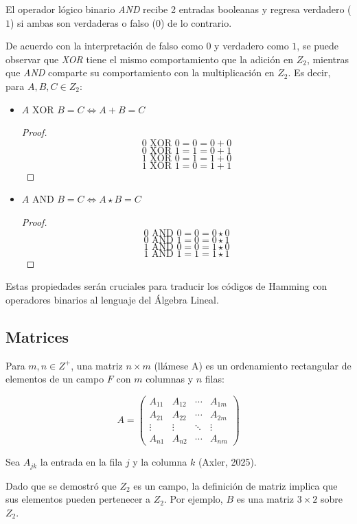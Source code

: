 \documentclass{article}
\begin{document}
El operador lógico binario \textit{AND} recibe 2 entradas booleanas y regresa verdadero ($1$) si ambas son verdaderas o falso ($0$) de lo contrario.

De acuerdo con la interpretación de falso como $0$ y verdadero como $1$, se puede observar que \textit{XOR} tiene el mismo comportamiento que la adición en $Z_2$, mientras que \textit{AND} comparte su comportamiento con la multiplicación en $Z_2$. Es decir, para $A, B, C \in Z_2$:

\begin{itemize}
    \item $A \text{ XOR } B = C \iff A + B = C$
    \begin{proof}
        $$0 \text{ XOR } 0 = 0 = 0 + 0$$
        $$0 \text{ XOR } 1 = 1 = 0 + 1$$
        $$1 \text{ XOR } 0 = 1 = 1 + 0$$
        $$1 \text{ XOR } 1 = 0 = 1 + 1$$
    \end{proof}
    \item $A \text{ AND } B = C \iff A \star B = C$
    \begin{proof}
        $$0 \text{ AND } 0 = 0 = 0 \star 0$$
        $$0 \text{ AND } 1 = 0 = 0 \star 1$$
        $$1 \text{ AND } 0 = 0 = 1 \star 0$$
        $$1 \text{ AND } 1 = 1 = 1 \star 1$$
    \end{proof}
\end{itemize}

Estas propiedades serán cruciales para traducir los códigos de Hamming con operadores binarios al lenguaje del Álgebra Lineal. 

\subsection{Matrices}

Para $m, n \in Z^+$, una matriz $n \times m$ (llámese A) es un ordenamiento rectangular de elementos de un campo $F$ con $m$ columnas y $n$ filas:

$$
A = \begin{pmatrix}
    A_{11} & A_{12} & \cdots & A_{1m} \\
    A_{21} & A_{22} & \cdots & A_{2m} \\
    \vdots & \vdots & \ddots & \vdots \\
    A_{n1} & A_{n2} & \cdots & A_{nm}
\end{pmatrix}
$$

Sea $A_{jk}$ la entrada en la fila $j$ y la columna $k$ (Axler, 2025).

Dado que se demostró que $Z_2$ es un campo, la definición de matriz implica que sus elementos pueden pertenecer a $Z_2$. Por ejemplo, $B$ es una matriz $ 3 \times 2 $ sobre $ Z_2 $.
\end{document}
